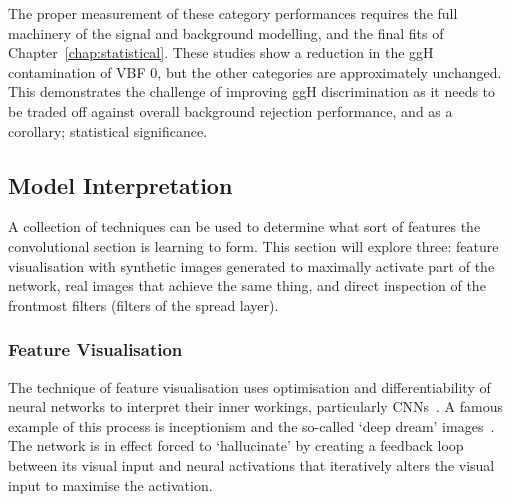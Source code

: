 The proper measurement of these category performances requires the full machinery of the signal and background modelling, and the final fits of Chapter~\ref{chap:statistical}.
These studies show a reduction in the ggH contamination of VBF 0, but the other categories are approximately unchanged. 
This demonstrates the challenge of improving ggH discrimination as it needs to be traded off against overall background rejection performance, and as a corollary; statistical significance.









\subsection{Model Interpretation}
A collection of techniques can be used to determine what sort of features the convolutional section is learning to form.
This section will explore three: feature visualisation with synthetic images generated to maximally activate part of the network, real images that achieve the same thing, and direct inspection of the frontmost filters (filters of the spread layer).



\subsubsection{Feature Visualisation}
The technique of feature visualisation uses optimisation and differentiability of neural networks to interpret their inner workings, particularly CNNs~\cite{FeatureVis}. A famous example of this process is inceptionism and the so-called `deep dream' images~\cite{Inceptionism}. The network is in effect forced to `hallucinate' by creating a feedback loop between its visual input and neural activations that iteratively alters the visual input to maximise the activation.

